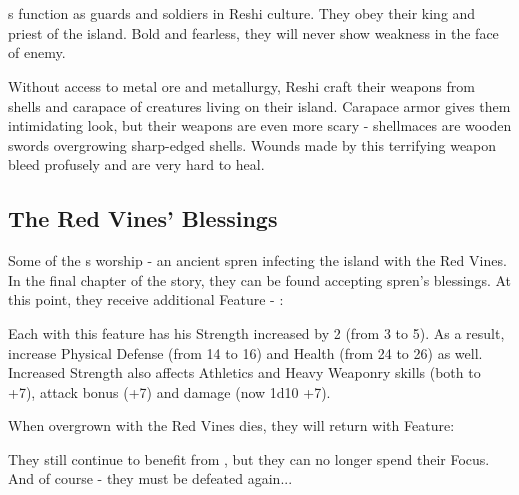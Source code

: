 \section{\enemyReshiWarriorName}
\label{enemyReshiWarrior}

\enemyReshiWarrior{}s function as guards and soldiers in Reshi culture. They obey their king and priest of the island. Bold and fearless, they will never show weakness in the face of enemy.

Without access to metal ore and metallurgy, Reshi craft their weapons from shells and carapace of creatures living on their island. Carapace armor gives them intimidating look, but their weapons are even more scary - shellmaces are wooden swords overgrowing sharp-edged shells. Wounds made by this terrifying weapon bleed profusely and are very hard to heal.

\subsection{The Red Vines' Blessings}

Some of the \enemyReshiWarrior{}s worship \npcSprenVines{} - an ancient spren infecting the island with the Red Vines. In the final chapter of the story, they can be found accepting spren's blessings. At this point, they receive additional Feature - \abilityVinesName[2]:

\abilityVines[2]{}

Each \enemyReshiWarrior{} with this feature has his Strength increased by 2 (from 3 to 5). As a result, increase Physical Defense (from 14 to 16) and Health (from 24 to 26) as well. Increased Strength also affects Athletics and Heavy Weaponry skills (both to +7), attack bonus (+7) and damage (now 1d10 +7).

When \enemyReshiWarrior{} overgrown with the Red Vines dies, they will return with \abilityHuskName[2] Feature:

\abilityHusk[2]{}

They still continue to benefit from \abilityVinesName[2], but they can no longer spend their Focus. And of course - they must be defeated again...
\\



